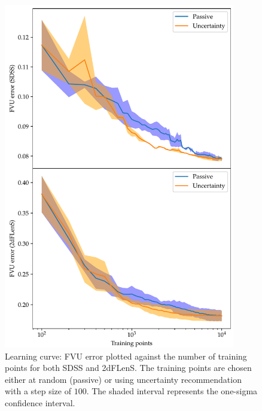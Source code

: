 \documentclass[11pt,twoside,openright]{report}
\begin{document}
  \begin{figure}
    \centering
    \includegraphics[width=0.9\textwidth]{uncertainty_fvu1.pdf}
    \caption{Learning curve: FVU error plotted against the number of training points for both SDSS and 2dFLenS. The training points are chosen either at random (passive) or using uncertainty recommendation with a step size of $100$. The shaded interval represents the one-sigma confidence interval.}
    \label{fig:uncertainty_fvu1}
  \end{figure}
\end{document}
